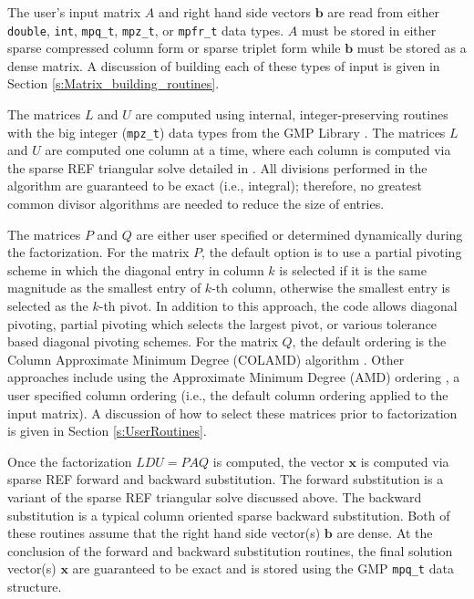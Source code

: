 \documentclass[11pt]{article}
\theoremstyle{definition}
\begin{document}
The user's input matrix $A$ and right hand side vectors $\mathbf{b}$ are read
from either \verb|double|, \verb|int|, \verb|mpq_t|, \verb|mpz_t|, or
\verb|mpfr_t| data types. $A$ must be stored in either sparse compressed column
form or sparse triplet form while $\mathbf{b}$ must be stored as a dense
matrix. A discussion of building each of these types of input is given in
Section \ref{s:Matrix_building_routines}.

The matrices $L$ and $U$ are computed using internal, integer-preserving routines with the big integer (\verb|mpz_t|) data types from the GMP Library \cite{granlund2015gnu}. The matrices $L$ and $U$ are computed one column at a time, where each column is computed via the sparse REF triangular solve detailed in \cite{lourenco2019exact}. All divisions performed in the algorithm are guaranteed to be exact (i.e., integral); therefore, no greatest common divisor algorithms are needed to reduce the size of entries.

The matrices $P$ and $Q$ are either user specified or determined dynamically
during the factorization. For the matrix $P$, the default option is to use a
partial pivoting scheme in which the diagonal entry in column $k$ is selected
if it is the same magnitude as the smallest entry of $k$-th column, otherwise
the smallest entry is selected as the $k$-th pivot. In addition to this
approach, the code allows diagonal pivoting, partial pivoting which selects the
largest pivot, or various tolerance based diagonal pivoting schemes. For the
matrix $Q$, the default ordering is the Column Approximate Minimum Degree
(COLAMD) algorithm \cite{davis2004algorithmcolamd,davis2004column}. Other
approaches include using the Approximate Minimum Degree (AMD) ordering
\cite{amestoy1996approximate,amestoy2004algorithmamd}, a user specified column
ordering (i.e., the default column ordering applied to the input matrix). A
discussion of how to select these matrices prior to factorization is given in
Section \ref{s:UserRoutines}.

Once the factorization $L D U = P A Q $ is computed, the vector $\mathbf{x}$ is
computed via sparse REF forward and backward substitution. The forward
substitution is a variant of the sparse REF triangular solve discussed above.
The backward substitution is a typical column oriented sparse backward
substitution. Both of these routines assume that the right hand side vector(s)
$\mathbf{b}$ are dense. At the conclusion of the forward and backward
substitution routines, the final solution vector(s) $\mathbf{x}$ are guaranteed
to be exact and is stored using the GMP \verb|mpq_t| data structure.
\end{document}
